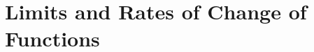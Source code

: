 \documentclass[../precalc.tex]{subfiles}
\begin{document}
\chapter{Limits and Rates of Change of Functions}
\end{document}
